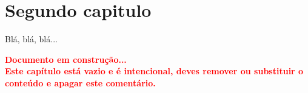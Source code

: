 
\chapter{Segundo capitulo}

Blá, blá, blá...

\textbf{\textcolor{Red}{Documento em construção... \\Este capítulo está vazio e é intencional, deves remover ou substituir o conteúdo e apagar este comentário.}}
